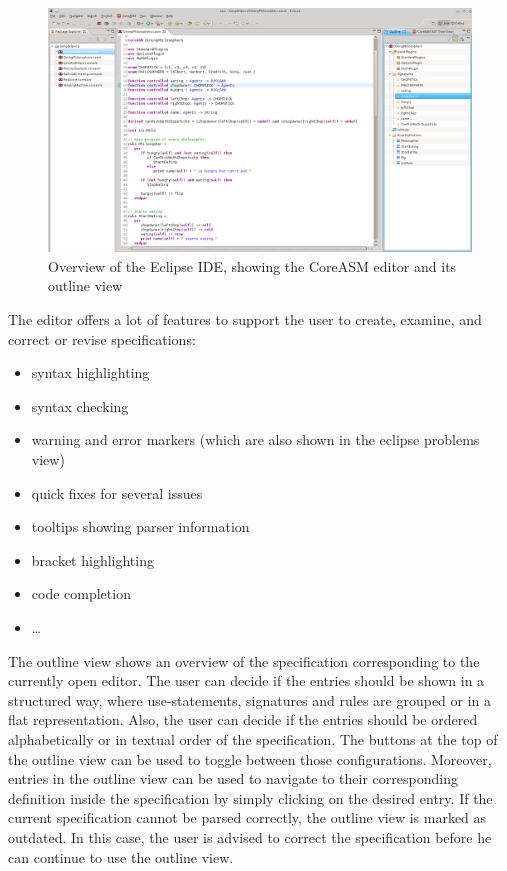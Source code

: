 \documentclass[10pt,oneside,a4paper]{article}
\begin{document}
\begin{figure}[h]
\centering
\includegraphics[width=\textwidth]{images/editor.png}
\caption{Overview of the Eclipse IDE, showing the CoreASM editor and its outline view}
\label{fig:editor}
\end{figure}


The editor offers a lot of features to support the user to create, examine, and correct or revise specifications:
\begin{itemize}
	\item syntax highlighting
	\item syntax checking
	\item warning and error markers (which are also shown in the eclipse problems view)
	\item quick fixes for several issues
	\item tooltips showing parser information
	\item bracket highlighting
	\item code completion
	\item \ldots
\end{itemize}

The outline view shows an overview of the specification corresponding to the currently open editor. The user can decide if the entries should be shown in a structured way, where use-statements, signatures and rules are grouped or in a flat representation. Also, the user can decide if the entries should be ordered alphabetically or in textual order of the specification. The buttons at the top of the outline view can be used to toggle between those configurations. Moreover, entries in the outline view can be used to navigate to their corresponding definition inside the specification by simply clicking on the desired entry. If the current specification cannot be parsed correctly, the outline view is marked as outdated. In this case, the user is advised to correct the specification before he can continue to use the outline view.
\end{document}
